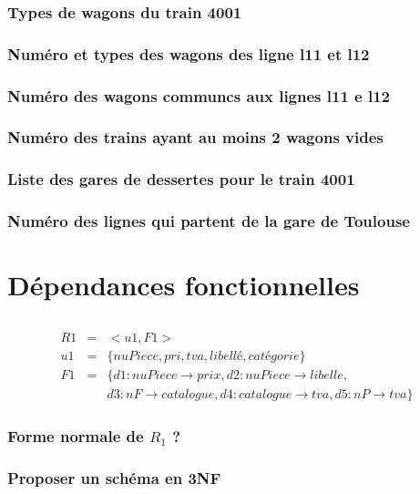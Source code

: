\subsubsection{Types de wagons du train 4001}
\subsubsection{Numéro et types des wagons des ligne l11 et l12}
\subsubsection{Numéro des wagons communcs aux lignes l11 e l12}
\subsubsection{Numéro des trains ayant au moins 2 wagons vides}
\subsubsection{Liste des gares de dessertes pour le train 4001}
\subsubsection{Numéro des lignes qui partent de la gare de Toulouse}
\section{Dépendances fonctionnelles}
\subsection{}
\begin{eqnarray*}
R1 &=&  <u1,F1>\\
u1 &=&  \{nuPiece, pri, tva, libellé, catégorie\}\\
F1 &=&  \{d1: nuPiece\rightarrow prix, d2: nuPiece \rightarrow libelle, \\&&d3: nF \rightarrow catalogue, d4: catalogue \rightarrow tva, d5: nP \rightarrow tva\}
\end{eqnarray*}
\subsubsection{Forme normale de $R_1$ ?}
\subsubsection{Proposer un schéma en 3NF}
